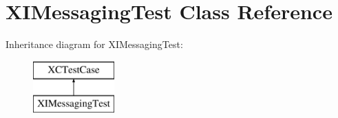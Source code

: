 \hypertarget{interface_x_i_messaging_test}{}\section{X\+I\+Messaging\+Test Class Reference}
\label{interface_x_i_messaging_test}
Inheritance diagram for X\+I\+Messaging\+Test\+:\begin{figure}[H]
\begin{center}
\leavevmode
\includegraphics[height=2.000000cm]{interface_x_i_messaging_test}
\end{center}
\end{figure}
